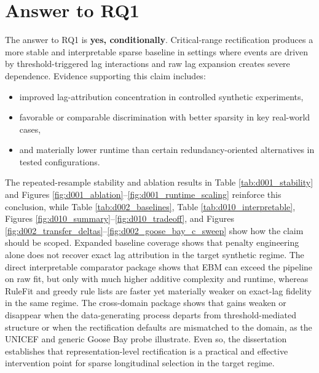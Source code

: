\FloatBarrier

\section{Answer to RQ1}

The answer to RQ1 is \textbf{yes, conditionally}. Critical-range rectification produces a more stable and interpretable sparse baseline in settings where events are driven by threshold-triggered lag interactions and raw lag expansion creates severe dependence. Evidence supporting this claim includes:
\begin{itemize}
    \item improved lag-attribution concentration in controlled synthetic experiments,
    \item favorable or comparable discrimination with better sparsity in key real-world cases,
    \item and materially lower runtime than certain redundancy-oriented alternatives in tested configurations.
\end{itemize}

The repeated-resample stability and ablation results in Table \ref{tab:d001_stability} and Figures \ref{fig:d001_ablation}--\ref{fig:d001_runtime_scaling} reinforce this conclusion, while Table \ref{tab:d002_baselines}, Table \ref{tab:d010_interpretable}, Figures \ref{fig:d010_summary}--\ref{fig:d010_tradeoff}, and Figures \ref{fig:d002_transfer_deltas}--\ref{fig:d002_goose_bay_c_sweep} show how the claim should be scoped. Expanded baseline coverage shows that penalty engineering alone does not recover exact lag attribution in the target synthetic regime. The direct interpretable comparator package shows that EBM can exceed the pipeline on raw fit, but only with much higher additive complexity and runtime, whereas RuleFit and greedy rule lists are faster yet materially weaker on exact-lag fidelity in the same regime. The cross-domain package shows that gains weaken or disappear when the data-generating process departs from threshold-mediated structure or when the rectification defaults are mismatched to the domain, as the UNICEF and generic Goose Bay probe illustrate. Even so, the dissertation establishes that representation-level rectification is a practical and effective intervention point for sparse longitudinal selection in the target regime.

